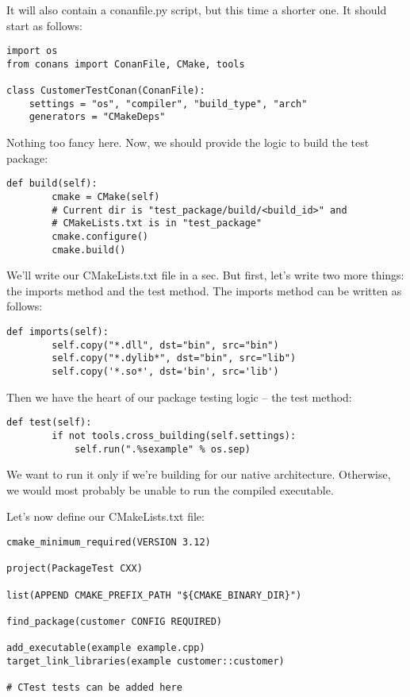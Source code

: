 It will also contain a conanfile.py script, but this time a shorter one. It should start as follows:

\begin{lstlisting}[style=stylePython]
import os
from conans import ConanFile, CMake, tools

class CustomerTestConan(ConanFile):
	settings = "os", "compiler", "build_type", "arch"
	generators = "CMakeDeps"
\end{lstlisting}

Nothing too fancy here. Now, we should provide the logic to build the test package:

\begin{lstlisting}[style=stylePython]
	def build(self):
		cmake = CMake(self)
		# Current dir is "test_package/build/<build_id>" and
		# CMakeLists.txt is in "test_package"
		cmake.configure()
		cmake.build()
\end{lstlisting}

We'll write our CMakeLists.txt file in a sec. But first, let's write two more things: the imports method and the test method. The imports method can be written as follows:

\begin{lstlisting}[style=stylePython]
	def imports(self):
		self.copy("*.dll", dst="bin", src="bin")
		self.copy("*.dylib*", dst="bin", src="lib")
		self.copy('*.so*', dst='bin', src='lib')
\end{lstlisting}

Then we have the heart of our package testing logic – the test method:

\begin{lstlisting}[style=stylePython]
	def test(self):
		if not tools.cross_building(self.settings):
			self.run(".%sexample" % os.sep)
\end{lstlisting}

We want to run it only if we're building for our native architecture. Otherwise, we would most probably be unable to run the compiled executable.

Let's now define our CMakeLists.txt file:

\begin{lstlisting}[style=styleCMake]
cmake_minimum_required(VERSION 3.12)

project(PackageTest CXX)

list(APPEND CMAKE_PREFIX_PATH "${CMAKE_BINARY_DIR}")

find_package(customer CONFIG REQUIRED)

add_executable(example example.cpp)
target_link_libraries(example customer::customer)

# CTest tests can be added here
\end{lstlisting}

